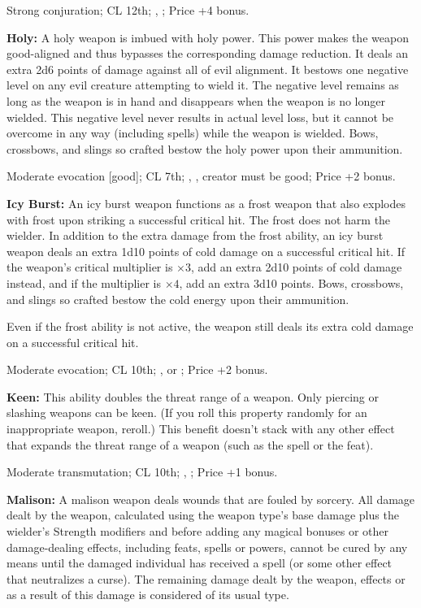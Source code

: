 Strong conjuration; CL 12th; , ; Price +4 bonus.

\textbf{Holy:} A holy weapon is imbued with holy power. This power makes the weapon good-aligned and thus bypasses the corresponding damage reduction. It deals an extra 2d6 points of damage against all of evil alignment. It bestows one negative level on any evil creature attempting to wield it. The negative level remains as long as the weapon is in hand and disappears when the weapon is no longer wielded. This negative level never results in actual level loss, but it cannot be overcome in any way (including  spells) while the weapon is wielded. Bows, crossbows, and slings so crafted bestow the holy power upon their ammunition.

Moderate evocation [good]; CL 7th; , , creator must be good; Price +2 bonus.

\textbf{Icy Burst:} An icy burst weapon functions as a frost weapon that also explodes with frost upon striking a successful critical hit. The frost does not harm the wielder. In addition to the extra damage from the frost ability, an icy burst weapon deals an extra 1d10 points of cold damage on a successful critical hit. If the weapon's critical multiplier is $\times3$, add an extra 2d10 points of cold damage instead, and if the multiplier is $\times4$, add an extra 3d10 points. Bows, crossbows, and slings so crafted bestow the cold energy upon their ammunition.

Even if the frost ability is not active, the weapon still deals its extra cold damage on a successful critical hit.

Moderate evocation; CL 10th; ,  or ; Price +2 bonus.

\textbf{Keen:} This ability doubles the threat range of a weapon. Only piercing or slashing weapons can be keen. (If you roll this property randomly for an inappropriate weapon, reroll.) This benefit doesn't stack with any other effect that expands the threat range of a weapon (such as the  spell or the  feat).

Moderate transmutation; CL 10th; , ; Price +1 bonus.

\textbf{Malison:} A malison weapon deals wounds that are fouled by sorcery. All damage dealt by the weapon, calculated using the weapon type’s base damage plus the wielder’s Strength modifiers and before adding any magical bonuses or other damage-dealing effects, including feats, spells or powers, cannot be cured by any means until the damaged individual has received a  spell (or some other effect that neutralizes a curse). The remaining damage dealt by the weapon, effects or as a result of this damage is considered of its usual type.

